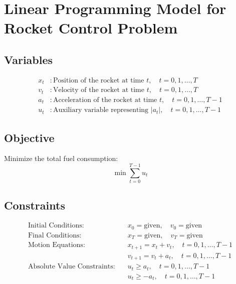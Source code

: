\documentclass{article}
\begin{document}
\section*{Linear Programming Model for Rocket Control Problem}

\subsection*{Variables}
\begin{align*}
x_t &: \text{Position of the rocket at time } t, \quad t = 0, 1, \ldots, T \\
v_t &: \text{Velocity of the rocket at time } t, \quad t = 0, 1, \ldots, T \\
a_t &: \text{Acceleration of the rocket at time } t, \quad t = 0, 1, \ldots, T-1 \\
u_t &: \text{Auxiliary variable representing } |a_t|, \quad t = 0, 1, \ldots, T-1
\end{align*}

\subsection*{Objective}
Minimize the total fuel consumption:
\[
\min \sum_{t=0}^{T-1} u_t
\]

\subsection*{Constraints}
\begin{align*}
\text{Initial Conditions:} \quad & x_0 = \text{given}, \quad v_0 = \text{given} \\
\text{Final Conditions:} \quad & x_T = \text{given}, \quad v_T = \text{given} \\
\text{Motion Equations:} \quad & x_{t+1} = x_t + v_t, \quad t = 0, 1, \ldots, T-1 \\
& v_{t+1} = v_t + a_t, \quad t = 0, 1, \ldots, T-1 \\
\text{Absolute Value Constraints:} \quad & u_t \geq a_t, \quad t = 0, 1, \ldots, T-1 \\
& u_t \geq -a_t, \quad t = 0, 1, \ldots, T-1
\end{align*}
\end{document}
